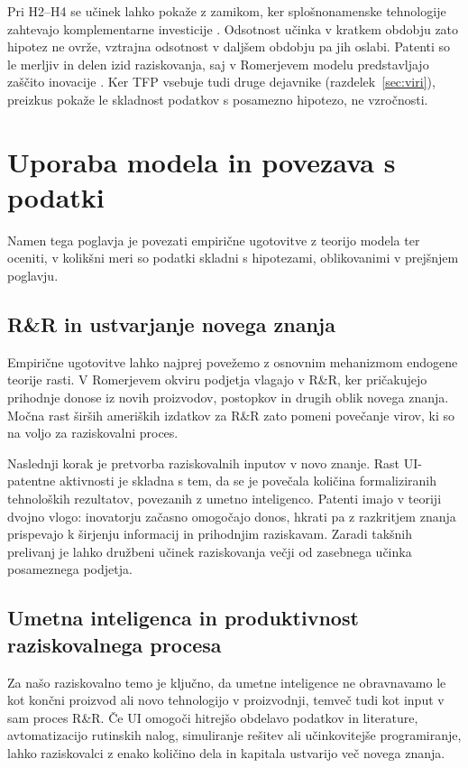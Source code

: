 \documentclass[12pt,a4paper]{article}
\begin{document}
Pri H2--H4 se učinek lahko pokaže z zamikom, ker splošnonamenske tehnologije zahtevajo komplementarne investicije \parencite[str.~28]{polanec_rast}. Odsotnost učinka v kratkem obdobju zato hipotez ne ovrže, vztrajna odsotnost v daljšem obdobju pa jih oslabi. Patenti so le merljiv in delen izid raziskovanja, saj v Romerjevem modelu predstavljajo zaščito inovacije \parencite[str.~27--28]{polanec_rast}. Ker TFP vsebuje tudi druge dejavnike (razdelek~\ref{sec:viri}), preizkus pokaže le skladnost podatkov s posamezno hipotezo, ne vzročnosti.
\section{Uporaba modela in povezava s podatki}\label{sec:uporaba}

Namen tega poglavja je povezati empirične ugotovitve z teorijo modela ter oceniti, v kolikšni meri so podatki skladni s hipotezami, oblikovanimi v prejšnjem poglavju.

\subsection{R\&R in ustvarjanje novega znanja}

Empirične ugotovitve lahko najprej povežemo z osnovnim mehanizmom endogene teorije rasti. V Romerjevem okviru podjetja vlagajo v R\&R, ker pričakujejo prihodnje donose iz novih proizvodov, postopkov in drugih oblik novega znanja. Močna rast širših ameriških izdatkov za R\&R zato pomeni povečanje virov, ki so na voljo za raziskovalni proces.

Naslednji korak je pretvorba raziskovalnih inputov v novo znanje. Rast UI-patentne aktivnosti je skladna s tem, da se je povečala količina formaliziranih tehnoloških rezultatov, povezanih z umetno inteligenco. Patenti imajo v teoriji dvojno vlogo: inovatorju začasno omogočajo donos, hkrati pa z razkritjem znanja prispevajo k širjenju informacij in prihodnjim raziskavam. Zaradi takšnih prelivanj je lahko družbeni učinek raziskovanja večji od zasebnega učinka posameznega podjetja.

\subsection{Umetna inteligenca in produktivnost raziskovalnega procesa}

Za našo raziskovalno temo je ključno, da umetne inteligence ne obravnavamo le kot končni proizvod ali novo tehnologijo v proizvodnji, temveč tudi kot input v sam proces R\&R. Če UI omogoči hitrejšo obdelavo podatkov in literature, avtomatizacijo rutinskih nalog, simuliranje rešitev ali učinkovitejše programiranje, lahko raziskovalci z enako količino dela in kapitala ustvarijo več novega znanja.
\end{document}
